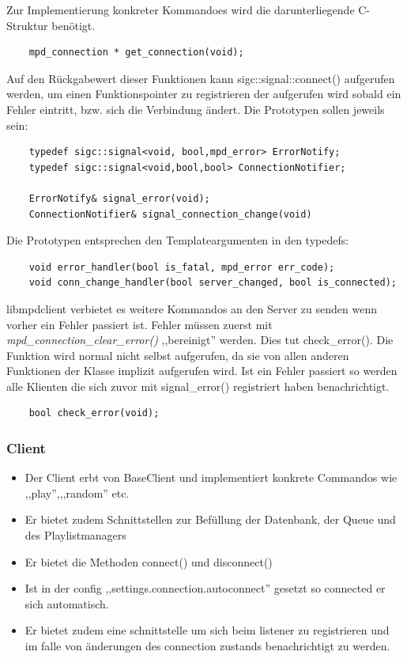 Zur Implementierung konkreter Kommandoes wird die darunterliegende C-Struktur benötigt.
\begin{verbatim}
    mpd_connection * get_connection(void);
\end{verbatim}

Auf den Rückgabewert dieser Funktionen kann sigc::signal::connect() aufgerufen werden, 
um einen Funktionspointer zu registrieren der aufgerufen wird sobald ein Fehler eintritt,
bzw. sich die Verbindung ändert. Die Prototypen sollen jeweils sein:
\begin{verbatim}
    typedef sigc::signal<void, bool,mpd_error> ErrorNotify;
    typedef sigc::signal<void,bool,bool> ConnectionNotifier;
    
    ErrorNotify& signal_error(void);
    ConnectionNotifier& signal_connection_change(void)
\end{verbatim}

Die Prototypen entsprechen den Templateargumenten in den typedefs:
\begin{verbatim}
    void error_handler(bool is_fatal, mpd_error err_code);
    void conn_change_handler(bool server_changed, bool is_connected); 
\end{verbatim} 

libmpdclient verbietet es weitere Kommandos an den Server zu senden wenn vorher ein Fehler passiert ist.
Fehler müssen zuerst mit \emph{mpd\_connection\_clear\_error()} ,,bereinigt'' werden. 
Dies tut check\_error(). Die Funktion wird normal nicht selbst aufgerufen, da sie von allen anderen Funktionen der Klasse
implizit aufgerufen wird. Ist ein Fehler passiert so werden alle Klienten die sich zuvor
mit signal\_error() registriert haben benachrichtigt. 
\begin{verbatim}
    bool check_error(void);
\end{verbatim}


\subsubsection{Client}
\begin{itemize}
    \item Der Client erbt von BaseClient und implementiert konkrete Commandos wie ,,play'',,,random'' etc.
    \item Er bietet zudem Schnittstellen zur Befüllung der Datenbank, der Queue und des Playlistmanagers
    \item Er bietet die Methoden connect() und disconnect() 
    \item Ist in der config ,,settings.connection.autoconnect'' gesetzt so connected er sich automatisch.
    \item Er bietet zudem eine schnittstelle um sich beim listener zu registrieren und im falle von 
        änderungen des connection zustands benachrichtigt zu werden.
\end{itemize}

